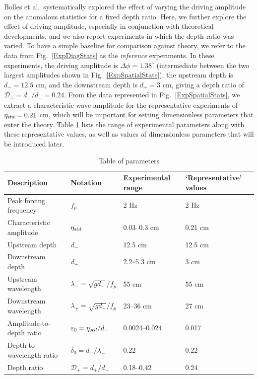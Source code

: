 \documentclass[11pt]{article}
\newcommand{\eps}{\varepsilon}
\newcommand{\etastd}{\eta_{\text std}}
\newcommand{\depth}{d}
\newcommand{\dup}{\depth_{-}}
\newcommand{\ddn}{\depth_{+}}
\newcommand{\lam}{\lambda}
\newcommand{\lamup}{\lam_{-}}
\newcommand{\lamdn}{\lam_{+}}
\newcommand{\drat}{\mathcal{D}}
\newcommand{\dratdn}{\drat_+}
\newcommand{\epsup}{\eps_0}
\newcommand{\delup}{\delta_0}
\newcommand{\Dphi}{\Delta \phi}
\begin{document}
	Bolles et al.~systematically explored the effect of varying the driving amplitude on the anomalous statistics for a fixed depth ratio. Here, we further explore the effect of driving amplitude, especially in conjunction with theoretical developments, and we also report experiments in which the depth ratio was varied. To have a simple baseline for comparison against theory, we refer to the data from Fig.~\ref{ExpDiagStats} as the {\em reference} experiments. In these experiments, the driving amplitude is $\Dphi = 1.38^{\circ}$ (intermediate between the two largest amplitudes shown in Fig.~\ref{ExpSpatialStats}), the upstream depth is $\dup = 12.5$ cm, and the downstream depth is $\ddn = 3$ cm, giving a depth ratio of $\dratdn = \ddn/\dup= 0.24$. From the data represented in Fig.~\ref{ExpSpatialStats}, we extract a characteristic wave amplitude for the representative experiments of $\etastd = 0.21$ cm, which will be important for setting dimensionless parameters that enter the theory. Table \ref{paramtable} lists the range of experimental parameters along with these representative values, as well as values of dimensionless parameters that will be introduced later.

\begin{table}[h]%
\begin{center}
\caption{Table of parameters}
\label{paramtable}
\begin{tabular}{l l l l}
\hline Description & Notation & Experimental range & `Representative' values \\
\hline
Peak forcing frequency	& $f_p$					& 2 Hz 		& 2 Hz \\
Characteristic amplitude	& $\etastd$				& 0.03--0.3 cm	& 0.21 cm \\
Upstream depth		& $\dup$					& 12.5 cm 	& 12.5 cm \\
Downstream depth		& $\ddn$					& 2.2--5.3 cm	& 3 cm \\
Upstream wavelength	& $\lamup = \sqrt{g \dup}/f_p$	& 55 cm 		& 55 cm \\
Downstream wavelength	& $\lamdn = \sqrt{g \ddn}/f_p$	& 23--36 cm	& 27 cm \\
%
Amplitude-to-depth ratio	& $\epsup = \etastd / \dup$	&0.0024--0.024	& 0.017 \\
Depth-to-wavelength ratio	& $\delup = \dup / \lamup$	& 0.22		& 0.22 \\
Depth ratio			& $\dratdn = \ddn/\dup$		& 0.18--0.42	& 0.24 \\
\end{tabular}
\end{center}
\end{table}
\end{document}
